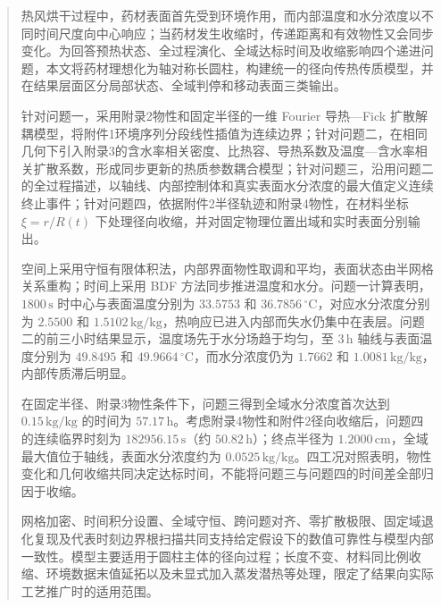 \begin{abstract}
热风烘干过程中，药材表面首先受到环境作用，而内部温度和水分浓度以不同时间尺度向中心响应；当药材发生收缩时，传递距离和有效物性又会同步变化。为回答预热状态、全过程演化、全域达标时间及收缩影响四个递进问题，本文将药材理想化为轴对称长圆柱，构建统一的径向传热传质模型，并在结果层面区分局部状态、全域判停和移动表面三类输出。

针对问题一，采用附录2物性和固定半径的一维 Fourier 导热—Fick 扩散解耦模型，将附件1环境序列分段线性插值为连续边界；针对问题二，在相同几何下引入附录3的含水率相关密度、比热容、导热系数及温度—含水率相关扩散系数，形成同步更新的热质参数耦合模型；针对问题三，沿用问题二的全过程描述，以轴线、内部控制体和真实表面水分浓度的最大值定义连续终止事件；针对问题四，依据附件2半径轨迹和附录4物性，在材料坐标 $\xi=r/R(t)$ 下处理径向收缩，并对固定物理位置出域和实时表面分别输出。

空间上采用守恒有限体积法，内部界面物性取调和平均，表面状态由半网格关系重构；时间上采用 BDF 方法同步推进温度和水分。问题一计算表明，$1800\,\mathrm{s}$ 时中心与表面温度分别为 $33.5753$ 和 $36.7856\,{}^\circ\mathrm{C}$，对应水分浓度分别为 $2.5500$ 和 $1.5102\,\mathrm{kg/kg}$，热响应已进入内部而失水仍集中在表层。问题二的前三小时结果显示，温度场先于水分场趋于均匀，至 $3\,\mathrm{h}$ 轴线与表面温度分别为 $49.8495$ 和 $49.9664\,{}^\circ\mathrm{C}$，而水分浓度仍为 $1.7662$ 和 $1.0081\,\mathrm{kg/kg}$，内部传质滞后明显。

在固定半径、附录3物性条件下，问题三得到全域水分浓度首次达到 $0.15\,\mathrm{kg/kg}$ 的时间为 $57.17\,\mathrm{h}$。考虑附录4物性和附件2径向收缩后，问题四的连续临界时刻为 $182956.15\,\mathrm{s}$（约 $50.82\,\mathrm{h}$）；终点半径为 $1.2000\,\mathrm{cm}$，全域最大值位于轴线，表面水分浓度约为 $0.0525\,\mathrm{kg/kg}$。四工况对照表明，物性变化和几何收缩共同决定达标时间，不能将问题三与问题四的时间差全部归因于收缩。

网格加密、时间积分设置、全域守恒、跨问题对齐、零扩散极限、固定域退化复现及代表时刻边界根扫描共同支持给定假设下的数值可靠性与模型内部一致性。模型主要适用于圆柱主体的径向过程；长度不变、材料同比例收缩、环境数据末值延拓以及未显式加入蒸发潜热等处理，限定了结果向实际工艺推广时的适用范围。

\end{abstract}

